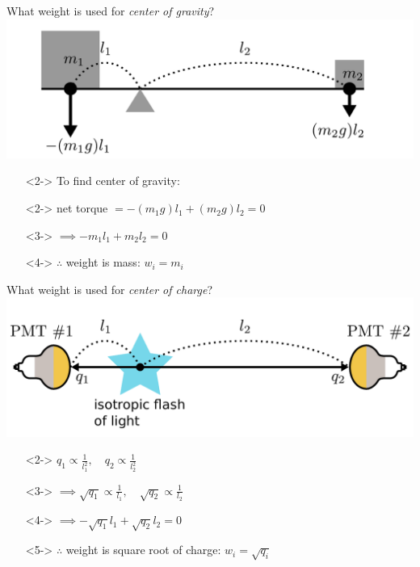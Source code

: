 \documentclass[14pt]{beamer}
\begin{document}
\begin{frame}{What weight is used for \emph{center of gravity}?}
	\includegraphics[width=\linewidth]{simple_example_of_center_of_gravity.pdf}
	\begin{itemize}
		\item[]<2-> To find center of gravity:
		\item[]<2-> net torque $= -(m_1 g) l_1 + (m_2 g) l_2 = 0$
		\item[]<3-> $\implies -m_1 l_1 + m_2 l_2 = 0$
		\item[]<4-> $\therefore$ weight is mass: $w_{i} = m_{i}$
	\end{itemize}
\end{frame}

\begin{frame}{What weight is used for \emph{\color{magenta}center of charge}?}
	\includegraphics[width=\linewidth]{simple_example_of_center_of_charge.pdf}
	\begin{itemize}
		\item[]<2-> $q_1 \propto \frac{1}{l_1^2}, \quad q_2 \propto
			\frac{1}{l_2^2}$
		\item[]<3-> $\implies \sqrt{q_1} \propto \frac{1}{l_1}, \quad \sqrt{q_2}
			\propto \frac{1}{l_2}$
		\item[]<4-> $\implies -\sqrt{q_1}{l_1} + \sqrt{q_2}{l_2} = 0$
		\item[]<5-> $\therefore$ weight is square root of charge: $w_{i} =
			\sqrt{q_{i}}$
	\end{itemize}
\end{frame}
\end{document}
